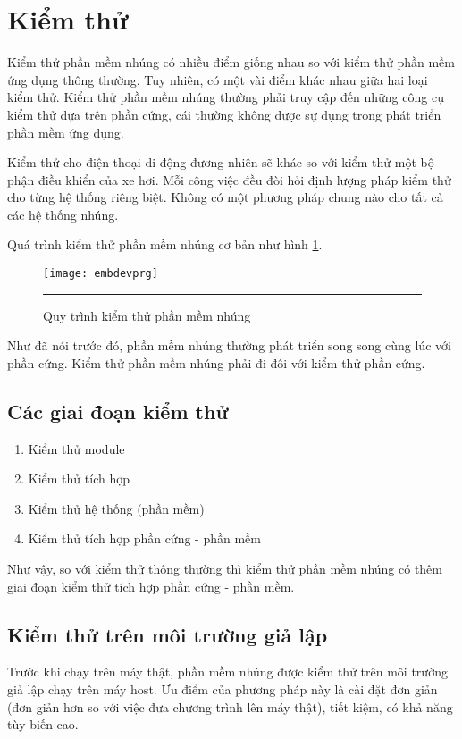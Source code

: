     \section{Kiểm thử}
        Kiểm thử phần mềm nhúng có nhiều điểm giống nhau so với kiểm thử phần
        mềm ứng dụng thông thường. Tuy nhiên, có một vài điểm khác nhau giữa
        hai loại kiểm thử. Kiểm thử phần mềm nhúng thường phải truy cập đến
        những công cụ kiểm thử dựa trên phần cứng, cái thường không được sự
        dụng trong phát triển phần mềm ứng dụng.

        Kiểm thử cho điện thoại di động đương nhiên sẽ khác so với kiểm thử một
        bộ phận điều khiển của xe hơi. Mỗi công việc đều đòi hỏi định lượng
        pháp kiểm thử cho từng hệ thống riêng biệt. Không có một phương pháp
        chung nào cho tất cả các hệ thống nhúng.

        Quá trình kiểm thử phần mềm nhúng cơ bản như hình \ref{fig:embdevprg}.

        \begin{figure}[H]
            \centering
            \texttt{[image: embdevprg]}
            \rule{35em}{0.5pt}
            \caption{Quy trình kiểm thử phần mềm nhúng}
            \label{fig:embdevprg}
        \end{figure}

        Như đã nói trước đó, phần mềm nhúng thường phát triển song song cùng
        lúc với phần cứng. Kiểm thử phần mềm nhúng phải đi đôi với kiểm thử
        phần cứng.

        \subsection{Các giai đoạn kiểm thử}
            \begin{enumerate}
                \item Kiểm thử module
                \item Kiểm thử tích hợp
                \item Kiểm thử hệ thống (phần mềm)
                \item Kiểm thử tích hợp phần cứng - phần mềm
            \end{enumerate}
            Như vậy, so với kiểm thử thông thường thì kiểm thử phần mềm nhúng
            có thêm giai đoạn kiểm thử tích hợp phần cứng - phần mềm.

        \subsection{Kiểm thử trên môi trường giả lập}
            Trước khi chạy trên máy thật, phần mềm nhúng được kiểm thử trên môi
            trường giả lập chạy trên máy host. Ưu điểm của phương pháp này là
            cài đặt đơn giản (đơn giản hơn so với việc đưa chương trình lên máy
            thật), tiết kiệm, có khả năng tùy biến cao.

